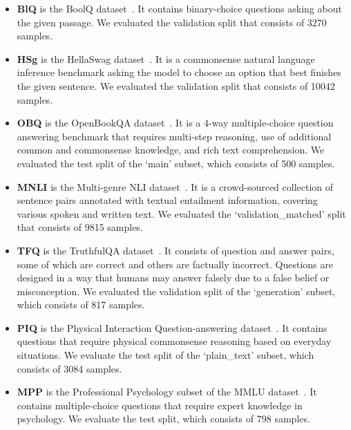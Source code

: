 \begin{itemize}[leftmargin=*]
    \item \textbf{BlQ} is the BoolQ dataset~\cite{clark2019boolq}. It contains binary-choice questions asking about the given passage. We evaluated the validation split that consists of 3270 samples.
    \item \textbf{HSg} is the HellaSwag dataset~\cite{zellers2019hellaswag}. It is a commonsense natural language inference benchmark asking the model to choose an option that best finishes the given sentence. We evaluated the validation split that consists of 10042 samples.
    \item \textbf{OBQ} is the OpenBookQA dataset~\cite{OpenBookQA2018}. It is a 4-way multiple-choice question answering benchmark that requires multi-step reasoning, use of additional common and commonsense knowledge, and rich text comprehension. We evaluated the test split of the `main' subset, which consists of 500 samples.
    \item \textbf{MNLI} is the Multi-genre NLI dataset~\cite{N18-1101}. It is a crowd-sourced collection of sentence pairs annotated with textual entailment information, covering various spoken and written text. We evaluated the `validation\_matched' split that consists of 9815 samples.
    \item \textbf{TFQ} is the TruthfulQA dataset~\cite{lin2022truthfulqa}. It consists of question and answer pairs, some of which are correct and others are factually incorrect. Questions are designed in a way that humans may answer falsely due to a false belief or misconception. We evaluated the validation split of the `generation' subset, which consists of 817 samples.
    \item \textbf{PIQ} is the Physical Interaction Question-answering dataset~\cite{Bisk2020}. It contains questions that require physical commonsense reasoning based on everyday situations. We evaluate the test split of the `plain\_text' subset, which consists of 3084 samples. 
    \item \textbf{MPP} is the Professional Psychology subset of the MMLU dataset~\cite{hendryckstest2021}. It contains multiple-choice questions that require expert knowledge in psychology. We evaluate the test split, which consists of 798 samples.

\end{itemize}
